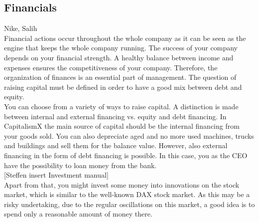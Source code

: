 \subsection{Financials}
Nike, Salih\\

Financial actions occur throughout the whole company as it can be seen as the engine that keeps the whole company running. The success of your company depends on your financial strength. A healthy balance between income and expenses ensures the competitiveness of your company. Therefore, the organization of finances is an essential part of management. The question of raising capital must be defined in order to have a good mix between debt and equity.\\

You can choose from a variety of ways to raise capital. A distinction is made between internal and external financing vs. equity and debt financing.
In CapitalismX the main source of capital should be the internal financing from your goods sold. You can also depreciate aged and no more used machines, trucks and buildings and sell them for the balance value. However, also external financing in the form of debt financing is possible. In this case, you as the CEO have the possibility to loan money from the bank.\\

[Steffen insert Investment manual]\\
Apart from that, you might invest some money into innovations on the stock market, which is similar to the well-known DAX stock market. As this may be a risky undertaking, due to the regular oscillations on this market, a good idea is to spend only a reasonable amount of money there. \\


